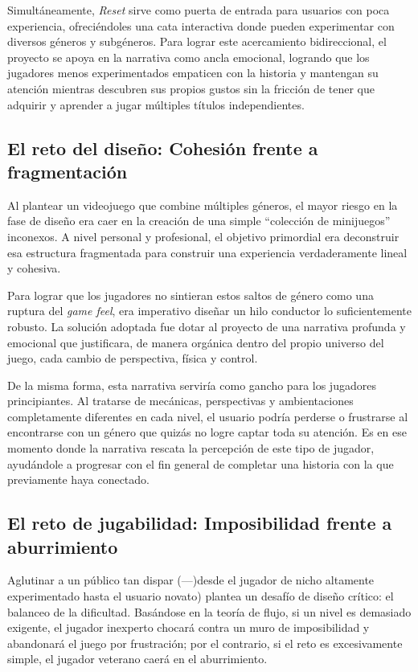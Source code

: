 Simultáneamente, \textit{Reset} sirve como puerta de entrada para usuarios con poca experiencia, ofreciéndoles una cata interactiva donde pueden experimentar con diversos géneros y subgéneros. Para lograr este acercamiento bidireccional, el proyecto se apoya en la narrativa como ancla emocional, logrando que los jugadores menos experimentados empaticen con la historia y mantengan su atención mientras descubren sus propios gustos sin la fricción de tener que adquirir y aprender a jugar múltiples títulos independientes.

\subsection{El reto del diseño: Cohesión frente a fragmentación}

Al plantear un videojuego que combine múltiples géneros, el mayor riesgo en la fase de diseño era caer en la creación de una simple ``colección de minijuegos'' inconexos. A nivel personal y profesional, el objetivo primordial era deconstruir esa estructura fragmentada para construir una experiencia verdaderamente lineal y cohesiva.

Para lograr que los jugadores no sintieran estos saltos de género como una ruptura del \textit{game feel}, era imperativo diseñar un hilo conductor lo suficientemente robusto. La solución adoptada fue dotar al proyecto de una narrativa profunda y emocional que justificara, de manera orgánica dentro del propio universo del juego, cada cambio de perspectiva, física y control.

De la misma forma, esta narrativa serviría como gancho para los jugadores principiantes. Al tratarse de mecánicas, perspectivas y ambientaciones completamente diferentes en cada nivel, el usuario podría perderse o frustrarse al encontrarse con un género que quizás no logre captar toda su atención. Es en ese momento donde la narrativa rescata la percepción de este tipo de jugador, ayudándole a progresar con el fin general de completar una historia con la que previamente haya conectado.

\subsection{El reto de jugabilidad: Imposibilidad frente a aburrimiento}

Aglutinar a un público tan dispar (—)desde el jugador de nicho altamente experimentado hasta el usuario novato) plantea un desafío de diseño crítico: el balanceo de la dificultad. Basándose en la teoría de flujo\cite{csikszentmihalyi1990flow}, si un nivel es demasiado exigente, el jugador inexperto chocará contra un muro de imposibilidad y abandonará el juego por frustración; por el contrario, si el reto es excesivamente simple, el jugador veterano caerá en el aburrimiento.

